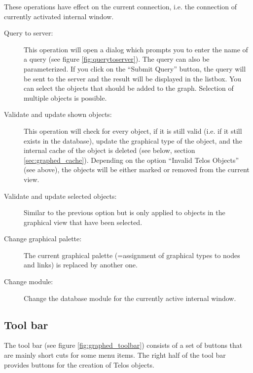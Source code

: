 These operations have effect on the current connection, i.e. the connection
of currently activated internal window.

\begin{description}
\item[Query to server:] This operation will open a dialog which prompts
you to enter the name of a query (see figure \ref{fig:querytoserver}).
The query can also be parameterized.
If you click on the ``Submit Query'' button, the query will be sent to
the server and the result will be displayed in the listbox. You can select
the objects that should be added to the graph. Selection of multiple objects is
possible.
\item[Validate and update shown objects:] This operation will check for
every object, if it is still valid (i.e. if it still exists in the database),
update the graphical type of the object, and the internal cache of the
object is deleted (see below, section \ref{sec:graphed_cache}). Depending on the option
``Invalid Telos Objects'' (see above), the objects will be either marked or removed
from the current view.
\item[Validate and update selected objects:] Similar to the previous option but
is only applied to objects in the graphical view that have been selected.
\item[Change graphical palette:] The current graphical palette (=assignment of
graphical types to nodes and links) is replaced by another one. 
\item[Change module:] Change the database module for the currently active internal window.
\end{description}



\subsection{Tool bar}

The tool bar (see figure \ref{fig:graphed_toolbar})
consists of a set of buttons that are mainly short cuts
for some menu items. The right half of the tool bar provides buttons
for the creation of Telos objects.


